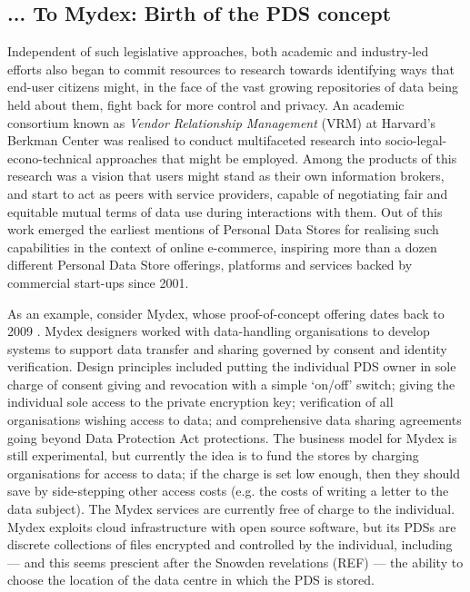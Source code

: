 \documentclass[graybox]{svmult}
\begin{document}
\subsection{... To Mydex: Birth of the PDS concept}

Independent of such legislative approaches, both academic and industry-led efforts also began to commit resources to research towards identifying ways that end-user citizens might, in the face of the vast growing repositories of data being held about them, fight back for more control and privacy. An academic consortium known as \emph{Vendor Relationship Management} (VRM) at Harvard's Berkman Center was realised to conduct multifaceted research into socio-legal-econo-technical approaches that might be employed.  Among the products of this research was a vision that users might stand as their own information brokers, and start to act as peers with service providers, capable of negotiating fair and equitable mutual terms of data use during interactions with them\cite{agustin2001vendor}.  Out of this work emerged the earliest mentions of Personal Data Stores for realising such capabilities in the context of online e-commerce, inspiring more than a dozen different Personal Data Store offerings, platforms and services backed by commercial start-ups since 2001\cite{ctrlshift-report}. 

As an example, consider Mydex, whose proof-of-concept offering dates back to 2009 \cite{}. Mydex designers worked with data-handling organisations to develop systems to support data transfer and sharing governed by consent and identity verification. Design principles included putting the individual PDS owner in sole charge of consent giving and revocation with a simple `on/off’ switch; giving the individual sole access to the private encryption key; verification of all organisations wishing access to data; and comprehensive data sharing agreements going beyond Data Protection Act protections. The business model for Mydex is still experimental, but currently the idea is to fund the stores by charging organisations for access to data; if the charge is set low enough, then they should save by side-stepping other access costs (e.g. the costs of writing a letter to the data subject). The Mydex services are currently free of charge to the individual. Mydex exploits cloud infrastructure with open source software, but  its PDSs are discrete collections of files encrypted and controlled by the individual, including --- and this seems prescient after the Snowden revelations (REF) --- the ability to choose the location of the data centre in which the PDS is stored.
\end{document}

